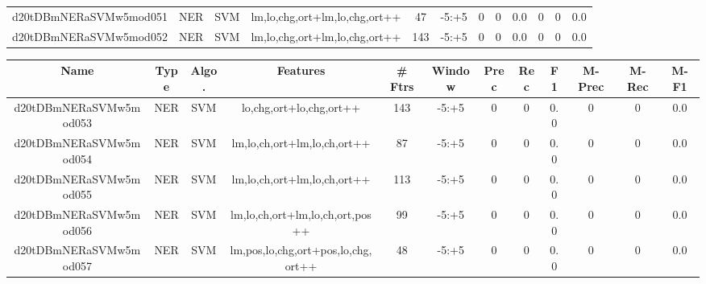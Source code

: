 \documentclass[a4paper]{article}
\begin{document}
\begin{landscape}
\begin{center}
\begin{tabular}{ |c|c|c|c|c|c|c|c|c|c|c|c|}
 
 	
 	\small{ d20tDBmNERaSVMw5mod051 } & \small{ NER} & \small{  SVM }  & lm,lo,chg,ort+lm,lo,chg,ort++  &  47 &  \small{  -5:+5 }  &  0 & 0 & 0.0  &  0 & 0 & 0.0 \\
 	

 
 	
 	\small{ d20tDBmNERaSVMw5mod052 } & \small{ NER} & \small{  SVM }  & lm,lo,chg,ort+lm,lo,chg,ort++  &  143 &  \small{  -5:+5 }  &  0 & 0 & 0.0  &  0 & 0 & 0.0 \\
 	
 \hline
\end{tabular}
\end{center}




\begin{center}
\begin{tabular}{ |c|c|c|c|c|c|c|c|c|c|c|c|} 
 \hline
 	Name & Type & Algo. & Features & \# Ftrs & Window & Prec & Rec & F1 & M-Prec & M-Rec & M-F1\\
 \hline

 	

 
 	
 	\small{ d20tDBmNERaSVMw5mod053 } & \small{ NER} & \small{  SVM }  & lo,chg,ort+lo,chg,ort++  &  143 &  \small{  -5:+5 }  &  0 & 0 & 0.0  &  0 & 0 & 0.0 \\
 	

 
 	
 	\small{ d20tDBmNERaSVMw5mod054 } & \small{ NER} & \small{  SVM }  & lm,lo,ch,ort+lm,lo,ch,ort++  &  87 &  \small{  -5:+5 }  &  0 & 0 & 0.0  &  0 & 0 & 0.0 \\
 	

 
 	
 	\small{ d20tDBmNERaSVMw5mod055 } & \small{ NER} & \small{  SVM }  & lm,lo,ch,ort+lm,lo,ch,ort++  &  113 &  \small{  -5:+5 }  &  0 & 0 & 0.0  &  0 & 0 & 0.0 \\
 	

 
 	
 	\small{ d20tDBmNERaSVMw5mod056 } & \small{ NER} & \small{  SVM }  & lm,lo,ch,ort+lm,lo,ch,ort,pos++  &  99 &  \small{  -5:+5 }  &  0 & 0 & 0.0  &  0 & 0 & 0.0 \\
 	

 
 	
 	\small{ d20tDBmNERaSVMw5mod057 } & \small{ NER} & \small{  SVM }  & lm,pos,lo,chg,ort+pos,lo,chg,ort++  &  48 &  \small{  -5:+5 }  &  0 & 0 & 0.0  &  0 & 0 & 0.0 \\
 	


\end{tabular}
\end{center}
\end{landscape}
\end{document}
